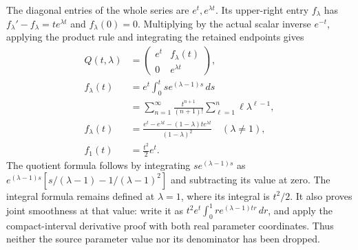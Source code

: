 \documentclass[
  11pt,
]{article}
\begin{document}
The diagonal entries of the whole series are \(e^t,e^{\lambda t}\). Its
upper-right entry \(f_\lambda\) has
\(f_\lambda'-f_\lambda=t e^{\lambda t}\) and \(f_\lambda(0)=0\).
Multiplying by the actual scalar inverse \(e^{-t}\), applying the
product rule and integrating the retained endpoints gives \[
 \begin{aligned}
 Q(t,\lambda)&=\begin{pmatrix}e^t&f_\lambda(t)\\0&e^{\lambda t}\end{pmatrix},\\
 f_\lambda(t)&=e^t\int_0^t s e^{(\lambda-1)s}\,ds\\
 &=\sum_{n=1}^{\infty}
       \frac{t^{n+1}}{(n+1)!}\sum_{\ell=1}^n\ell\lambda^{\ell-1},\\
 f_\lambda(t)&=
 \frac{e^t-e^{\lambda t}-(1-\lambda)t e^{\lambda t}}
      {(1-\lambda)^2}\quad(\lambda\ne1),\\
 f_1(t)&=\frac{t^2}{2}e^t.
 \end{aligned}
 \tag{MP4}
\] The quotient formula follows by integrating \(s e^{(\lambda-1)s}\) as
\(e^{(\lambda-1)s}[s/(\lambda-1)-1/(\lambda-1)^2]\) and subtracting its
value at zero. The integral formula remains defined at \(\lambda=1\),
where its integral is \(t^2/2\). It also proves joint smoothness at that
value: write it as \(t^2e^t\int_0^1r e^{(\lambda-1)tr}\,dr\), and apply
the compact-interval derivative proof with both real parameter
coordinates. Thus neither the source parameter value nor its denominator
has been dropped.
\end{document}
